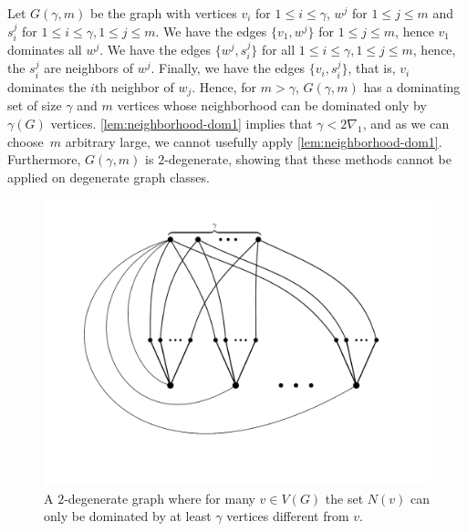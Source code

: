 \begin{example}
Let $G(\gamma,m)$ be the graph with vertices $v_i$ for $1\leq i\leq \gamma$,
$w^j$ for $1\leq j\leq m$ and $s_i^j$ for $1\leq i\leq \gamma, 1\leq j\leq m$.
We have the edges $\{v_1, w^j\}$ for $1\leq j\leq m$, hence $v_1$
dominates all $w^j$. We have the edges $\{w^j, s_i^j\}$ for all $1\leq i\leq \gamma,
1\leq j\leq m$, hence, the $s_i^j$ are neighbors of $w^j$. Finally,
we have the edges $\{v_i, s_i^j\}$, that is, $v_i$ dominates the $i$th
neighbor of $w_j$. Hence, for $m>\gamma$,
$G(\gamma, m)$ has a dominating set of size
$\gamma$ and $m$ vertices whose neighborhood can be dominated
only by $\gamma(G)$ vertices. \cref{lem:neighborhood-dom1} implies
that $\gamma < 2\nabla_1$, and as we can choose~$m$ arbitrary
large, we cannot usefully apply \cref{lem:neighborhood-dom1}.
Furthermore, $G(\gamma,m)$ is
\mbox{$2$-degenerate}, showing that these methods cannot be applied on
degenerate graph classes.

\begin{center}
  \begin{figure}
    \includegraphics[scale=0.3]{ds1.png}
    \caption{ A $2$-degenerate graph where for many $v\in V(G)$ the set $N(v)$ can only be dominated by at least $\gamma$ vertices different from $v$. }
  \end{figure}
\end{center}
\end{example}
